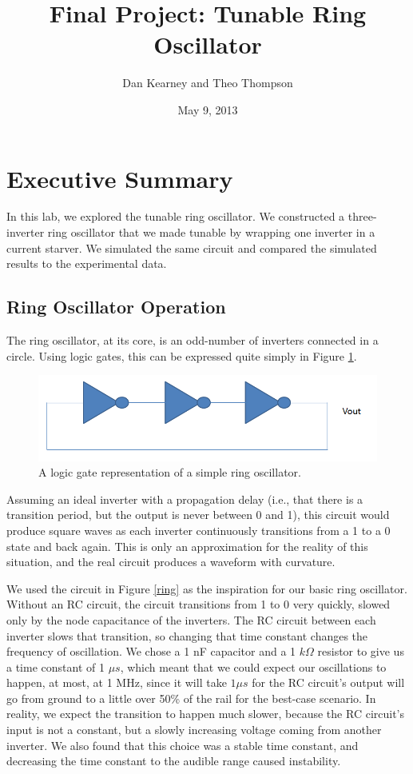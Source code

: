 \documentclass{article}
\title{Final Project: Tunable Ring Oscillator}
\author{Dan Kearney and Theo Thompson}
\date{May 9, 2013}
\begin{document}
\maketitle

\section*{Executive Summary}

In this lab, we explored the tunable ring oscillator.  We constructed a three-inverter ring oscillator that we made tunable by wrapping one inverter in a current starver.  We simulated the same circuit and compared the simulated results to the experimental data.

\subsection*{Ring Oscillator Operation}

The ring oscillator, at its core, is an odd-number of inverters connected in a circle.  Using logic gates, this can be expressed quite simply in Figure \ref{simpleSchem}.

\begin{figure}[H]
\centering
\includegraphics[scale=.4]{simpleSchem.png}
\caption{A logic gate representation of a simple ring oscillator.}
\label{simpleSchem}
\end{figure}

Assuming an ideal inverter with a propagation delay (i.e., that there is a transition period, but the output is never between 0 and 1), this circuit would produce square waves as each inverter continuously transitions from a 1 to a 0 state and back again.  This is only an approximation for the reality of this situation, and the real circuit produces a waveform with curvature.

We used the circuit in Figure \ref{ring} as the inspiration for our basic ring oscillator.  Without an RC circuit, the circuit transitions from 1 to 0 very quickly, slowed only by the node capacitance of the inverters.  The RC circuit between each inverter slows that transition, so changing that time constant changes the frequency of oscillation.  We chose a 1 nF capacitor and a 1 $k\Omega$ resistor to give us a time constant of 1 $\mu s$, which meant that we could expect our oscillations to happen, at most, at 1 MHz, since it will take $1 \mu s$ for the RC circuit's output will go from ground to a little over 50\% of the rail for the best-case scenario.  In reality, we expect the transition to happen much slower, because the RC circuit's input is not a constant, but a slowly increasing voltage coming from another inverter.  We also found that this choice was a stable time constant, and decreasing the time constant to the audible range caused instability.
\end{document}
